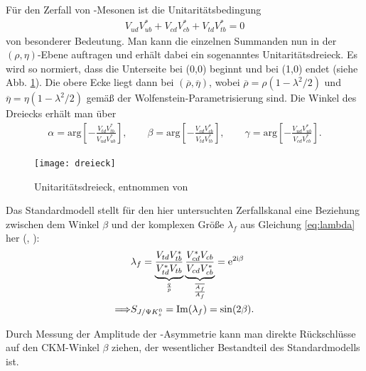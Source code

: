 Für den Zerfall von \Bd-Mesonen ist die Unitaritätsbedingung
\begin{align}
V_{ud}V_{ub}^* + V_{cd}V_{cb}^* + V_{td}V_{tb}^* = 0
\end{align}
von besonderer Bedeutung. Man kann die einzelnen Summanden nun in der $(\rho,\eta)$-Ebene auftragen und erhält dabei ein sogenanntes Unitaritätsdreieck. Es wird so normiert, dass die Unterseite bei (0,0) beginnt und bei (1,0) endet (siehe Abb. \ref{fig:unitarity}). Die obere Ecke liegt dann bei $(\overline{\rho}, \overline{\eta})$, wobei $\overline{\rho} = \rho(1-\lambda^2/2)$ und $\overline{\eta} = \eta(1-\lambda^2/2)$ gemäß der Wolfenstein-Parametrisierung sind. Die Winkel des Dreiecks erhält man über
\begin{align}
\alpha = \text{arg}\left[-\frac{V_{td}V_{tb}^*}{V_{ud}V_{ub}^*}\right], \qquad
\beta = \text{arg}\left[-\frac{V_{cd}V_{cb}^*}{V_{td}V_{tb}^*}\right], \qquad
\gamma = \text{arg}\left[-\frac{V_{ud}V_{ub}^*}{V_{cd}V_{cb}^*}\right].
\end{align}

\begin{figure}[hptb]
\centering
\texttt{[image: dreieck]}
\caption{Unitaritätsdreieck, entnommen von \cite{dreieck}}
\label{fig:unitarity}
\end{figure}

Das Standardmodell stellt für den hier untersuchten Zerfallskanal eine Beziehung zwischen dem Winkel $\beta$ und der komplexen Größe $\lambda_f$ aus Gleichung \ref{eq:lambda} her (\cite{nir}, \cite{noguchi}):
\begin{align}
&\lambda_f = \underbrace{\frac{V_{td}V_{tb}^*}{V_{td}^*V_{tb}}}_{\frac{q}{p}} \underbrace{\frac{V_{cd}^*V_{cb}}{V_{cd}V_{cb}^*}}_{\frac{\overline{A_f}}{A_f}} = \mathrm{e}^{2\mathrm{i}\beta} \\
\Longrightarrow &S_{J/\Psi K_s^0} = \mathrm{Im}(\lambda_f) = \sin(2\beta).
\end{align}
 
Durch Messung der Amplitude der \CP-Asymmetrie kann man direkte Rückschlüsse auf den CKM-Winkel $\beta$ ziehen, der wesentlicher Bestandteil des Standardmodells ist. \cite{nir}